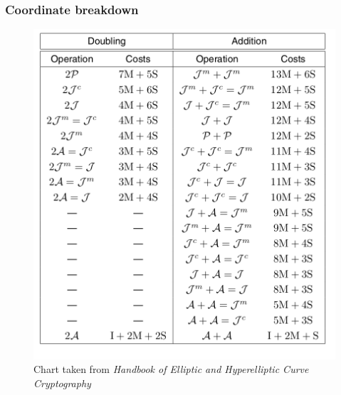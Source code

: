 \documentclass[options]{beamer}
\begin{document}
\begin{frame}
    \frametitle{Coordinate breakdown}
    \begin{figure}[h]
    \caption{Chart taken from \emph{Handbook of Elliptic and Hyperelliptic Curve Cryptography}}
    \centering
    \includegraphics[height = .75\textheight]{img/coordinate_breakdown.png}
    \end{figure}
\end{frame}
\end{document}

